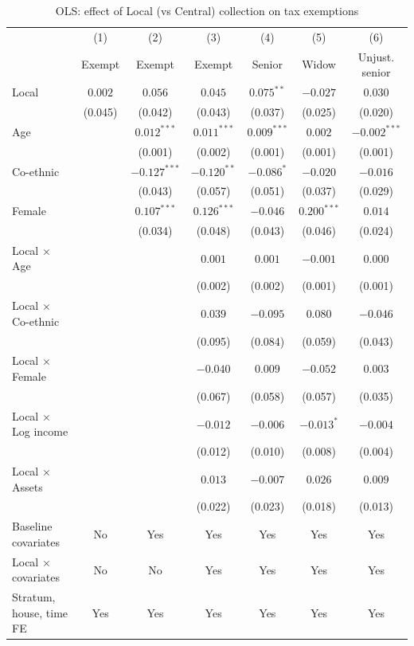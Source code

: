 \begin{table}[!htbp]\centering\footnotesize
\caption{OLS: effect of Local (vs Central) collection on tax exemptions}
\label{tab:ols}
\begin{tabular}{lcccccc}
\hline\hline
 & (1) & (2) & (3) & (4) & (5) & (6) \\
 & Exempt & Exempt & Exempt & Senior & Widow & Unjust. senior \\ \hline
Local & $0.002$ & $0.056$ & $0.045$ & $0.075^{**}$ & $-0.027$ & $0.030$ \\
 & (0.045) & (0.042) & (0.043) & (0.037) & (0.025) & (0.020) \\
Age &  & $0.012^{***}$ & $0.011^{***}$ & $0.009^{***}$ & $0.002$ & $-0.002^{***}$ \\
 &  & (0.001) & (0.002) & (0.001) & (0.001) & (0.001) \\
Co-ethnic &  & $-0.127^{***}$ & $-0.120^{**}$ & $-0.086^{*}$ & $-0.020$ & $-0.016$ \\
 &  & (0.043) & (0.057) & (0.051) & (0.037) & (0.029) \\
Female &  & $0.107^{***}$ & $0.126^{***}$ & $-0.046$ & $0.200^{***}$ & $0.014$ \\
 &  & (0.034) & (0.048) & (0.043) & (0.046) & (0.024) \\
Local $\times$ Age &  &  & $0.001$ & $0.001$ & $-0.001$ & $0.000$ \\
 &  &  & (0.002) & (0.002) & (0.001) & (0.001) \\
Local $\times$ Co-ethnic &  &  & $0.039$ & $-0.095$ & $0.080$ & $-0.046$ \\
 &  &  & (0.095) & (0.084) & (0.059) & (0.043) \\
Local $\times$ Female &  &  & $-0.040$ & $0.009$ & $-0.052$ & $0.003$ \\
 &  &  & (0.067) & (0.058) & (0.057) & (0.035) \\
Local $\times$ Log income &  &  & $-0.012$ & $-0.006$ & $-0.013^{*}$ & $-0.004$ \\
 &  &  & (0.012) & (0.010) & (0.008) & (0.004) \\
Local $\times$ Assets &  &  & $0.013$ & $-0.007$ & $0.026$ & $0.009$ \\
 &  &  & (0.022) & (0.023) & (0.018) & (0.013) \\
\hline
Baseline covariates & No & Yes & Yes & Yes & Yes & Yes \\
Local $\times$ covariates & No & No & Yes & Yes & Yes & Yes \\
Stratum, house, time FE & Yes & Yes & Yes & Yes & Yes & Yes \\

\end{tabular}
\end{table}
